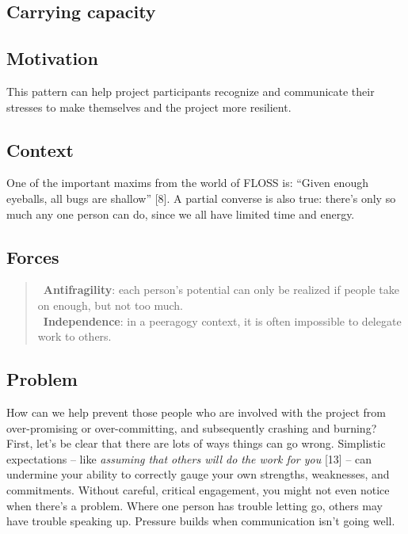 \hypertarget{carrying-capacity}{%
\subsection{Carrying capacity}\label{carrying-capacity}}

\hypertarget{motivation}{%
\subsection{Motivation}\label{motivation}}

This pattern can help project participants recognize and communicate
their stresses to make themselves and the project more resilient.

\hypertarget{context}{%
\subsection{Context}\label{context}}

One of the important maxims from the world of FLOSS is: ``Given enough
eyeballs, all bugs are shallow'' {{[}8{]}}. A partial converse is also
true: there's only so much any one person can do, since we all have
limited time and energy.

\hypertarget{forces}{%
\subsection{Forces}\label{forces}}

\begin{quote}
\Santifragility\ \textbf{Antifragility}: each person's potential can only be realized if people take on enough, but not too much.\\
\Sindependence\ \textbf{Independence}: in a peeragogy context, it is often impossible to delegate work to others.
\end{quote}

\hypertarget{problem}{%
\subsection{Problem}\label{problem}}

How can we help prevent those people who are involved with the project
from over-promising or over-committing, and subsequently crashing and
burning? First, let's be clear that there are lots of ways things can go
wrong. Simplistic expectations -- like \emph{assuming that others will
do the work for you} {{[}13{]}} -- can undermine your ability to
correctly gauge your own strengths, weaknesses, and commitments. Without
careful, critical engagement, you might not even notice when there's a
problem. Where one person has trouble letting go, others may have
trouble speaking up. Pressure builds when communication isn't going
well.

